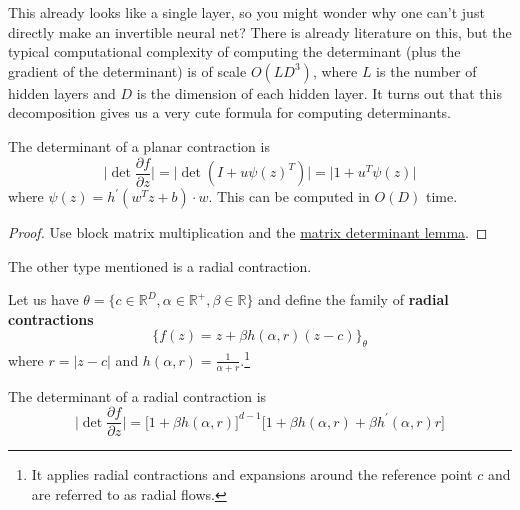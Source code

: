   This already looks like a single layer, so you might wonder why one can't just directly make an invertible neural net? There is already literature on this, but the typical computational complexity of computing the determinant (plus the gradient of the determinant) is of scale $O(LD^3)$, where $L$ is the number of hidden layers and $D$ is the dimension of each hidden layer. It turns out that this decomposition gives us a very cute formula for computing determinants. 

  \begin{lemma}
    The determinant of a planar contraction is 
    \begin{equation}
      \bigg| \det \frac{\partial f}{\partial z} \bigg| = \big| \det (I + u \psi (z)^T ) \big| = \big| 1 + u^T \psi(z) \big| 
    \end{equation} 
    where $\psi(z) = h^\prime (w^T z + b) \cdot w$. This can be computed in $O(D)$ time. 
  \end{lemma}
  \begin{proof}
    Use block matrix multiplication and the \href{https://en.wikipedia.org/wiki/Matrix_determinant_lemma}{matrix determinant lemma}.
  \end{proof}

  The other type mentioned is a radial contraction. 

  \begin{definition}
    Let us have $\theta = \{ c \in \mathbb{R}^D, \alpha \in \mathbb{R}^+, \beta \in \mathbb{R} \}$ and define the family of \textbf{radial contractions} 
    \begin{equation}
      \{ f(z) = z + \beta h(\alpha, r) (z - c) \}_\theta
    \end{equation}
    where $r = |z - c|$ and $h(\alpha, r) = \frac{1}{\alpha + r}$.\footnote{It applies radial contractions and expansions around the reference point $c$ and are referred to as radial flows. }
  \end{definition}

  \begin{lemma} 
    The determinant of a radial contraction is 
    \begin{equation}
      \bigg| \det \frac{\partial f}{\partial z} \bigg| = \big[ 1 + \beta h(\alpha, r)\big]^{d-1} \big[ 1 + \beta h(\alpha, r) + \beta h^\prime (\alpha, r) r \big]
    \end{equation}
  \end{lemma}

